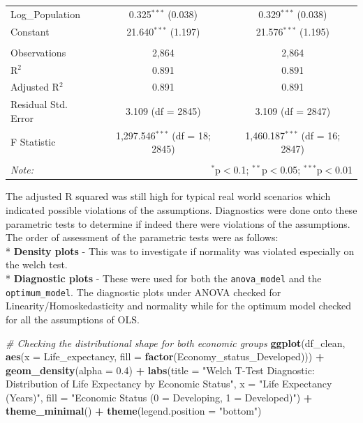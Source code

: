 \documentclass[
  10pt,
]{article}
\newenvironment{Shaded}{\begin{snugshade}}{\end{snugshade}}
\newcommand{\AttributeTok}[1]{\textcolor[rgb]{0.13,0.29,0.53}{#1}}
\newcommand{\CommentTok}[1]{\textcolor[rgb]{0.56,0.35,0.01}{\textit{#1}}}
\newcommand{\FloatTok}[1]{\textcolor[rgb]{0.00,0.00,0.81}{#1}}
\newcommand{\FunctionTok}[1]{\textcolor[rgb]{0.13,0.29,0.53}{\textbf{#1}}}
\newcommand{\NormalTok}[1]{#1}
\newcommand{\SpecialCharTok}[1]{\textcolor[rgb]{0.81,0.36,0.00}{\textbf{#1}}}
\newcommand{\StringTok}[1]{\textcolor[rgb]{0.31,0.60,0.02}{#1}}
\begin{document}
\begin{table}[!htbp]
\begin{tabular}{@{\extracolsep{5pt}}lcc}
  Log\_Population & 0.325$^{***}$ (0.038) & 0.329$^{***}$ (0.038) \\ 
  Constant & 21.640$^{***}$ (1.197) & 21.576$^{***}$ (1.195) \\ 
 \hline \\[-1.8ex] 
Observations & 2,864 & 2,864 \\ 
R$^{2}$ & 0.891 & 0.891 \\ 
Adjusted R$^{2}$ & 0.891 & 0.891 \\ 
Residual Std. Error & 3.109 (df = 2845) & 3.109 (df = 2847) \\ 
F Statistic & 1,297.546$^{***}$ (df = 18; 2845) & 1,460.187$^{***}$ (df = 16; 2847) \\ 
\hline 
\hline \\[-1.8ex] 
\textit{Note:}  & \multicolumn{2}{r}{$^{*}$p$<$0.1; $^{**}$p$<$0.05; $^{***}$p$<$0.01} \\ 
\end{tabular} 
\end{table}

The adjusted R squared was still high for typical real world scenarios
which indicated possible violations of the assumptions. Diagnostics were
done onto these parametric tests to determine if indeed there were
violations of the assumptions.\\

The order of assessment of the parametric tests were as follows:\\
* \textbf{Density plots} - This was to investigate if normality was
violated especially on the welch test.\\
* \textbf{Diagnostic plots} - These were used for both the
\texttt{anova\_model} and the \texttt{optimum\_model}. The diagnostic
plots under ANOVA checked for Linearity/Homoskedasticity and normality
while for the optimum model checked for all the assumptions of OLS.\\

\begin{Shaded}
\begin{Highlighting}[]
\CommentTok{\# Checking the distributional shape for both economic groups}
\FunctionTok{ggplot}\NormalTok{(df\_clean, }\FunctionTok{aes}\NormalTok{(}\AttributeTok{x =}\NormalTok{ Life\_expectancy, }\AttributeTok{fill =} \FunctionTok{factor}\NormalTok{(Economy\_status\_Developed))) }\SpecialCharTok{+}
  \FunctionTok{geom\_density}\NormalTok{(}\AttributeTok{alpha =} \FloatTok{0.4}\NormalTok{) }\SpecialCharTok{+}
  \FunctionTok{labs}\NormalTok{(}\AttributeTok{title =} \StringTok{"Welch T{-}Test Diagnostic: Distribution of Life Expectancy by Economic Status"}\NormalTok{,}
       \AttributeTok{x =} \StringTok{"Life Expectancy (Years)"}\NormalTok{,}
       \AttributeTok{fill =} \StringTok{"Economic Status (0 = Developing, 1 = Developed)"}\NormalTok{) }\SpecialCharTok{+}
  \FunctionTok{theme\_minimal}\NormalTok{() }\SpecialCharTok{+}
  \FunctionTok{theme}\NormalTok{(}\AttributeTok{legend.position =} \StringTok{"bottom"}\NormalTok{)}
\end{Highlighting}
\end{Shaded}
\end{document}
